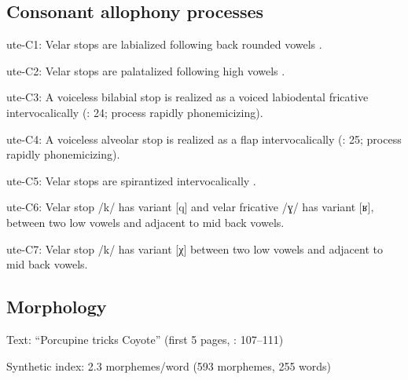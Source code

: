 {\subsection*{Consonant allophony processes}
\begin{appendixdesc}

\item[ute-C1:] Velar stops are labialized following back rounded vowels \citep[29]{Givón2011}.

\item[ute-C2:] Velar stops are palatalized following high vowels \citep[29]{Givón2011}.

\item[ute-C3:] A voiceless bilabial stop is realized as a voiced labiodental fricative intervocalically (\citealt{Givón2011}: 24; process rapidly phonemicizing).

\item[ute-C4:] A voiceless alveolar stop is realized as a flap intervocalically (\citealt{Givón2011}: 25; process rapidly phonemicizing).

\item[ute-C5:] Velar stops are spirantized intervocalically \citep[26--27]{Givón2011}.

\item[ute-C6:] Velar stop /k/ has variant [q] and velar fricative /ɣ/ has variant [ʁ], between two low vowels and adjacent to mid back vowels.

\item[ute-C7:] Velar stop /k/ has variant [χ] between two low vowels and adjacent to mid back vowels.
\end{appendixdesc}
\subsection*{Morphology}

\begin{appendixdesc}

\item[Text:] “Porcupine tricks Coyote” (first 5 pages, \citealt{Givón2013}: 107--111)

\item[Synthetic index:] 2.3 morphemes/word (593 morphemes, 255 words)
\end{appendixdesc}
}
